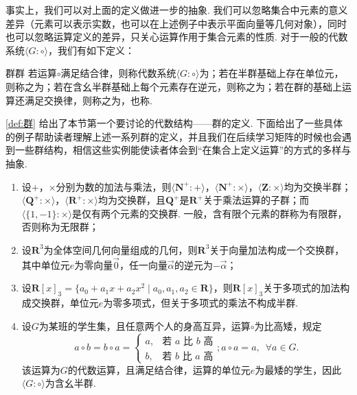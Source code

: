 事实上，我们可以对上面的定义做进一步的抽象. 我们可以忽略集合中元素的意义差异（元素可以表示实数，也可以在上述例子中表示平面向量等几何对象），同时也可以忽略运算定义的差异，只关心运算作用于集合元素的性质. 对于一般的代数系统$\langle G\colon\circ\rangle$，我们有如下定义：
\begin{definition}{群}{群}
    若运算$\circ$满足结合律，则称代数系统$\langle G\colon\circ\rangle$为；若在半群基础上存在单位元，则称之为；若在含幺半群基础上每个元素存在逆元，则称之为；若在群的基础上运算还满足交换律，则称之为，也称.
\end{definition}

\autoref{def:群} 给出了本节第一个要讨论的代数结构——群的定义. 下面给出了一些具体的例子帮助读者理解上述一系列群的定义，并且我们在后续学习矩阵的时候也会遇到一些群结构，相信这些实例能使读者体会到``在集合上定义运算''的方式的多样与抽象.

\begin{example}{}{}
    \begin{enumerate}
        \item 设$+$，$\times$分别为数的加法与乘法，则$\langle\mathbf{N}^+\colon +\rangle$，$\langle\mathbf{N}^+\colon \times\rangle$，$\langle\mathbf{Z}\colon \times\rangle$均为交换半群；$\langle\mathbf{Q}^+\colon \times\rangle$，$\langle\mathbf{R}^+\colon \times\rangle$均为交换群，且$\mathbf{Q}^+$是$\mathbf{R}^+$关于乘法运算的子群；而$\langle\{1,-1\}\colon \times\rangle$是仅有两个元素的交换群. 一般，含有限个元素的群称为有限群，否则称为无限群；
        \item 设$\mathbf{R}^3$为全体空间几何向量组成的几何，则$\mathbf{R}^3$关于向量加法构成一个交换群，其中单位元$e$为零向量$\vec{0}$，任一向量$\vec{\alpha}$的逆元为$-\vec{\alpha}$；
        \item 设$\mathbf{R}[x]_3=\{a_0+a_1x+a_2x^2\mid a_0,a_1,a_2\in\mathbf{R}\}$，则$\mathbf{R}[x]_3$关于多项式的加法构成交换群，单位元$e$为零多项式，但关于多项式的乘法不构成半群.
        \item 设$G$为某班的学生集，且任意两个人的身高互异，运算$\circ$为比高矮，规定
        \[
        a \circ b = b \circ a = \begin{cases}
            a, & \text{若 $a$ 比 $b$ 高} \\
            b, & \text{若 $b$ 比 $a$ 高}
        \end{cases}; a\circ a=a,\enspace\forall a \in G.
        \]
        该运算为$G$的代数运算，且满足结合律，运算的单位元$e$为最矮的学生，因此$\langle G\colon\circ\rangle$为含幺半群.
    \end{enumerate}
\end{example}

